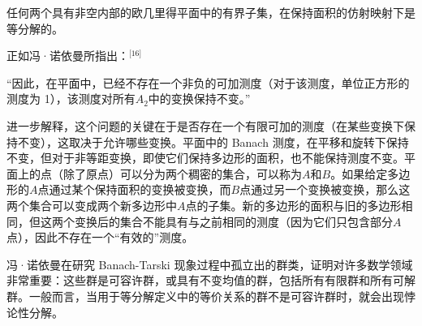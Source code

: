 任何两个具有非空内部的欧几里得平面中的有界子集，在保持面积的仿射映射下是等分解的。

正如冯·诺依曼所指出：\(^\text{[16]}\)

“因此，在平面中，已经不存在一个非负的可加测度（对于该测度，单位正方形的测度为 1），该测度对所有\( A_2 \)中的变换保持不变。”

进一步解释，这个问题的关键在于是否存在一个有限可加的测度（在某些变换下保持不变），这取决于允许哪些变换。平面中的 Banach 测度，在平移和旋转下保持不变，但对于非等距变换，即使它们保持多边形的面积，也不能保持测度不变。平面上的点（除了原点）可以分为两个稠密的集合，可以称为\( A \)和\( B \)。如果给定多边形的\( A \)点通过某个保持面积的变换被变换，而\( B \)点通过另一个变换被变换，那么这两个集合可以变成两个新多边形中\( A \)点的子集。新的多边形的面积与旧的多边形相同，但这两个变换后的集合不能具有与之前相同的测度（因为它们只包含部分\( A \)点），因此不存在一个“有效的”测度。

冯·诺依曼在研究 Banach-Tarski 现象过程中孤立出的群类，证明对许多数学领域非常重要：这些群是可容许群，或具有不变均值的群，包括所有有限群和所有可解群。一般而言，当用于等分解定义中的等价关系的群不是可容许群时，就会出现悖论性分解。
